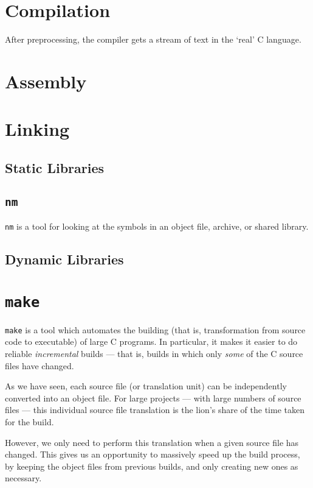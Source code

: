 \documentclass[a4paper,10pt]{report}
\newcommand{\kw}[1]{\texttt{#1}}
\begin{document}
\section{Compilation}

After preprocessing, the compiler gets a stream of text in the `real'
C language.

\section{Assembly}



\section{Linking}

\subsection{Static Libraries}

\subsection{\kw{nm}}

\kw{nm} is a tool for looking at the symbols in an object file,
archive, or shared library.

\subsection{Dynamic Libraries}

\section{\kw{make}}

\kw{make} is a tool which automates the building (that is,
transformation from source code to executable) of large C programs. In
particular, it makes it easier to do reliable \emph{incremental}
builds --- that is, builds in which only \emph{some} of the C source
files have changed.

As we have seen, each source file (or translation unit) can be
independently converted into an object file. For large projects ---
with large numbers of source files --- this individual source file
translation is the lion's share of the time taken for the build.

However, we only need to perform this translation when a given source
file has changed. This gives us an opportunity to massively speed up
the build process, by keeping the object files from previous builds,
and only creating new ones as necessary.
\end{document}
